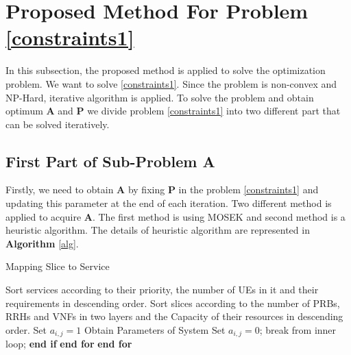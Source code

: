 \documentclass[conference]{IEEEtran}
\begin{document}
\section{Proposed Method For Problem \eqref{constraints1}}
In this subsection, the proposed method is applied to solve the optimization problem.
We want to solve \eqref{constraints1}. Since the problem is non-convex and NP-Hard, iterative algorithm is applied.
To solve the problem and obtain optimum $\boldsymbol{A}$ and $\boldsymbol{P}$ we divide problem \eqref{constraints1} into 
two different part that can be solved iteratively.  
\subsection{First Part of Sub-Problem A}\label{firstsub}
Firstly, we need to obtain $\boldsymbol{A}$ by fixing $\boldsymbol{P}$ in the problem \eqref{constraints1} and updating this parameter at the end of each iteration. Two different method is applied to acquire $\boldsymbol{A}$. The first method is using MOSEK and second method is a heuristic algorithm.
The details of heuristic algorithm are represented in \textbf{Algorithm} \eqref{alg}.  
\begin{algorithm}
\caption{Mapping Slice to Service}\label{alg}
\begin{algorithmic}[1]
\State Sort services according to their priority, the number of UEs in it and their requirements in descending order.
\State Sort slices according to the number of PRBs, RRHs and VNFs in two layers and the Capacity of their resources in descending order. 
\State Set $a_{i,j} = 1$
\State Obtain Parameters of System
\State Set $a_{i,j} = 0$;
\Else
\State break from inner loop;
\EndIf 
\State \textbf{end if}
\EndFor 
\State \textbf{end for}
\EndFor 
\State \textbf{end for}
\end{algorithmic}
\end{algorithm}
\end{document}
